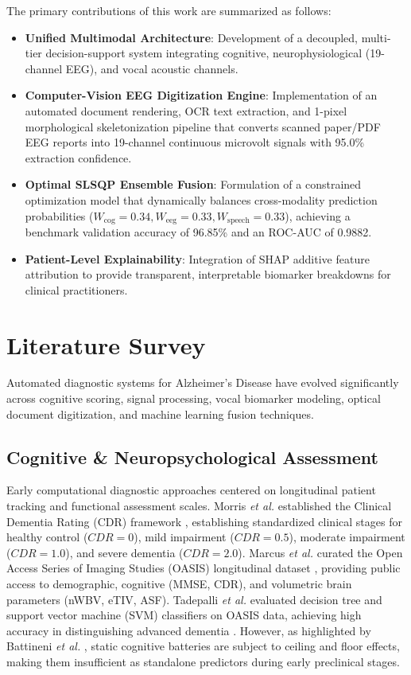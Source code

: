 \documentclass[conference]{IEEEtran}
\begin{document}
The primary contributions of this work are summarized as follows:
\begin{itemize}
    \item \textbf{Unified Multimodal Architecture}: Development of a decoupled, multi-tier decision-support system integrating cognitive, neurophysiological (19-channel EEG), and vocal acoustic channels.
    \item \textbf{Computer-Vision EEG Digitization Engine}: Implementation of an automated document rendering, OCR text extraction, and 1-pixel morphological skeletonization pipeline that converts scanned paper/PDF EEG reports into 19-channel continuous microvolt signals with 95.0\% extraction confidence.
    \item \textbf{Optimal SLSQP Ensemble Fusion}: Formulation of a constrained optimization model that dynamically balances cross-modality prediction probabilities ($W_{\text{cog}} = 0.34, W_{\text{eeg}} = 0.33, W_{\text{speech}} = 0.33$), achieving a benchmark validation accuracy of 96.85\% and an ROC-AUC of 0.9882.
    \item \textbf{Patient-Level Explainability}: Integration of SHAP additive feature attribution to provide transparent, interpretable biomarker breakdowns for clinical practitioners.
\end{itemize}

\section{Literature Survey}
Automated diagnostic systems for Alzheimer's Disease have evolved significantly across cognitive scoring, signal processing, vocal biomarker modeling, optical document digitization, and machine learning fusion techniques.

\subsection{Cognitive \& Neuropsychological Assessment}
Early computational diagnostic approaches centered on longitudinal patient tracking and functional assessment scales. Morris \textit{et al.} established the Clinical Dementia Rating (CDR) framework \cite{morris1993}, establishing standardized clinical stages for healthy control ($CDR=0$), mild impairment ($CDR=0.5$), moderate impairment ($CDR=1.0$), and severe dementia ($CDR=2.0$). Marcus \textit{et al.} curated the Open Access Series of Imaging Studies (OASIS) longitudinal dataset \cite{marcus2007}, providing public access to demographic, cognitive (MMSE, CDR), and volumetric brain parameters (nWBV, eTIV, ASF). Tadepalli \textit{et al.} evaluated decision tree and support vector machine (SVM) classifiers on OASIS data, achieving high accuracy in distinguishing advanced dementia \cite{tadepalli2021}. However, as highlighted by Battineni \textit{et al.} \cite{battineni2021}, static cognitive batteries are subject to ceiling and floor effects, making them insufficient as standalone predictors during early preclinical stages.
\end{document}
